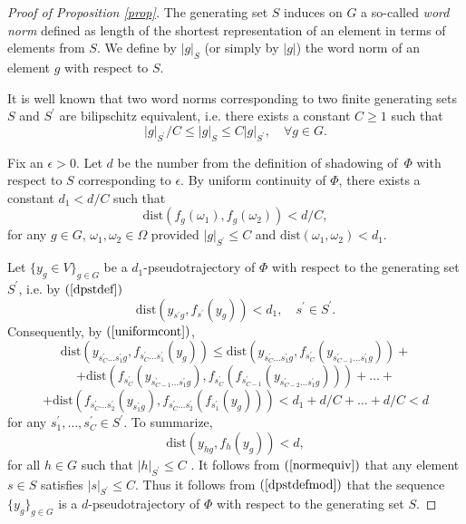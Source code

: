 \documentclass[12pt]{article}
\theoremstyle{plain}
\theoremstyle{definition}
\begin{document}
\begin{proof}[Proof of Proposition \ref{prop}]
The generating set $S$ induces on $G$ a so-called \textit{word norm} defined as length of the shortest representation of an element in terms of elements from $S$. We define by $|g|_S$ (or simply by $|g|$) the word norm of an element $g$ with respect to $S$.

It is well known that two word norms corresponding to two finite generating sets $S$ and $S^{\prime}$ are bilipschitz equivalent, i.e. there exists a constant $C\geq 1$ such that
\begin{equation}
\label{normequiv}
|g|_{S^\prime}/C\leq |g|_S\leq C|g|_{S^\prime},\quad\forall g\in G.
\end{equation}

Fix an $\epsilon>0$. Let $d$ be the number from the definition of shadowing of~$\Phi$ with respect to $S$ corresponding to $\epsilon$.
By uniform continuity of $\Phi$, there exists a constant $d_1< d/C$ such that %
\begin{equation}
\label{uniformcont}
\mbox{dist}(f_g(\omega_1),f_g(\omega_2))< d/C,
\end{equation}
for any $g\in G$, $\omega_1,\omega_2\in \Omega$ provided $|g|_{S^{\prime}}\leq C$ and $\mbox{dist}(\omega_1,\omega_2)< d_1$.

Let $\{y_{g} \in V\}_{g\in G}$ be a $d_1$-pseudotrajectory of $\Phi$ with respect to the generating set $S^{\prime}$, i.e. by $(\ref{dpstdef})$
$$
\mbox{dist}(y_{s^{\prime}g}, f_{s^{\prime}}(y_{g}))< d_1,\quad s^{\prime}\in S^{\prime}.
$$
Consequently, by $(\ref{uniformcont})$,
$$\mbox{dist}(y_{s^{\prime}_C\ldots s^{\prime}_1 g},f_{s^{\prime}_C\ldots s^{\prime}_1} (y_g))\leq
\mbox{dist}(y_{s^{\prime}_C\ldots s^{\prime}_1 g}, f_{s^{\prime}_C}(y_{s^{\prime}_{C-1}\ldots s^{\prime}_1 g}))+$$
$$+ \mbox{dist}(f_{s^{\prime}_C}(y_{s^{\prime}_{C-1}\ldots s^{\prime}_1 g}), f_{s^{\prime}_C}(f_{s^{\prime}_{C-1}}(y_{s^{\prime}_{C-2}\ldots s^{\prime}_1 g}))) + \ldots + $$
$$+\mbox{dist}( f_{ s^{\prime}_C\ldots s^{\prime}_2 }( y_{s^{\prime}_1 g} ), f_{s^{\prime}_C\ldots s^{\prime}_2}(f_{s^{\prime}_1}(y_g)))< d_1 + d/C + \ldots + d/C<d
$$
for any $s^{\prime}_1,\ldots, s^{\prime}_C\in S^{\prime}$.
To summarize,
\begin{equation}
\label{dpstdefmod}
\mbox{dist}(y_{hg}, f_{h}(y_{g}))< d,
\end{equation}
for all $h \in G$ such that $|h|_{S^{\prime}}\leq C$ .
It follows from $(\ref{normequiv})$ that any element $s\in S$ satisfies $|s|_{S^{\prime}}\leq C$.
Thus it follows from $(\ref{dpstdefmod})$ that the sequence $\{y_{g}\}_{g\in G}$ is a $d$-pseudotrajectory of $\Phi$ with respect to the generating set $S$.


\end{proof}
\end{document}
